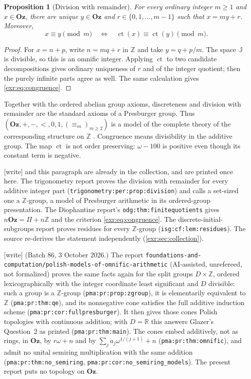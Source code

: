 \documentclass[11pt,letterpaper]{article}
\numberwithin{equation}{section}
\newtheorem{proposition}[proposition]{Proposition}
\theoremstyle{definition}
\theoremstyle{remark}
\newcommand{\Oz}{\mathbf{Oz}}
\newcommand{\Z}{\mathbb Z}
\newcommand{\R}{\mathbb R}
\newcommand{\J}{\mathbb J}
\newcommand{\ct}{\operatorname{ct}}
\newcommand{\rpath}[1]{\nolinkurl{#1}}%
\newcommand{\lbl}[1]{\nolinkurl{#1}}%
\newcommand{\wtag}{\textup{[write]}}%
\begin{document}
\begin{proposition}[Division with remainder]\label{exr:prop:division}
For every ordinary integer $m\geq1$ and $x\in\Oz$, there are unique $y\in\Oz$ and
$r\in\{0,1,\ldots,m-1\}$ such that $x=my+r$. Moreover,
\begin{equation}\label{exr:eq:congruence}
 x\equiv y\pmod m\quad\Longleftrightarrow\quad
 \ct(x)\equiv\ct(y)\pmod m.
\end{equation}
\end{proposition}
\begin{proof}
For $x=n+p$, write $n=mq+r$ in $\Z$ and take $y=q+p/m$. The space $\J$ is divisible,
so this is an omnific integer. Applying $\ct$ to two candidate decompositions gives
ordinary uniqueness of $r$ and of the integer quotient; then the purely infinite
parts agree as well. The same calculation gives \eqref{exr:eq:congruence}.
\end{proof}

Together with the ordered abelian group axioms, discreteness and division with
remainder are the standard axioms of a Presburger group. Thus $(\Oz,+,-,<,0,1,
(\equiv_m)_{m\geq2})$ is a model of the complete theory of the corresponding
structure on $\Z$ \cite{cluckers}. Congruence means divisibility in the additive
group. The map $\ct$ is not order preserving: $\omega-100$ is positive even though
its constant term is negative.

\wtag{}  and this paragraph are already in the
collection, and are printed once here. The trigonometry report proves the
division with remainder for every additive integer part
(\lbl{trigonometry:per:prop:division}) and calls a set-sized one a
$\Z$-group, a model of Presburger arithmetic in its ordered-group
presentation. The Diophantine report's \lbl{odg:thm:finitequotients} gives
$n\Oz=\Pi+n\Z$ and the criterion \eqref{exr:eq:congruence}. The
discrete-initial-subgroups report proves residues for every $\Z$-group
(\lbl{isg:cf:lem:residues}). The source re-derives the statement
independently (\cref{exr:sec:collection}).

\wtag{} (Batch 86, 3 October 2026.) The report
\rpath{foundations-and-computation/polish-models-of-omnific-arithmetic}
(AI-assisted, unrefereed, not formalized) proves the same facts again for
the split groups $D\times\Z$, ordered lexicographically with the integer
coordinate least significant and $D$ divisible: such a group is a
$\Z$-group (\lbl{pma:pr:prop:zgroup}), it is elementarily equivalent to
$\Z$ (\lbl{pma:pr:thm:qe}), and its nonnegative cone satisfies the full
additive induction scheme (\lbl{pma:pr:cor:fullpresburger}). It then gives
those cones Polish topologies with continuous addition; with $D=\R$ this
answers Glazer's Question~2 as printed (\lbl{pma:pr:thm:main}). The cones
embed additively, not as rings, in $\Oz$, by $r\omega+n$ and by
$\sum_j a_j\omega^{1/(j+1)}+n$ (\lbl{pma:pr:thm:omnific}), and admit no
unital semiring multiplication with the same addition
(\lbl{pma:pr:thm:no_semiring}, \lbl{pma:pr:cor:no_semiring_models}). The
present report puts no topology on $\Oz$.
\end{document}

